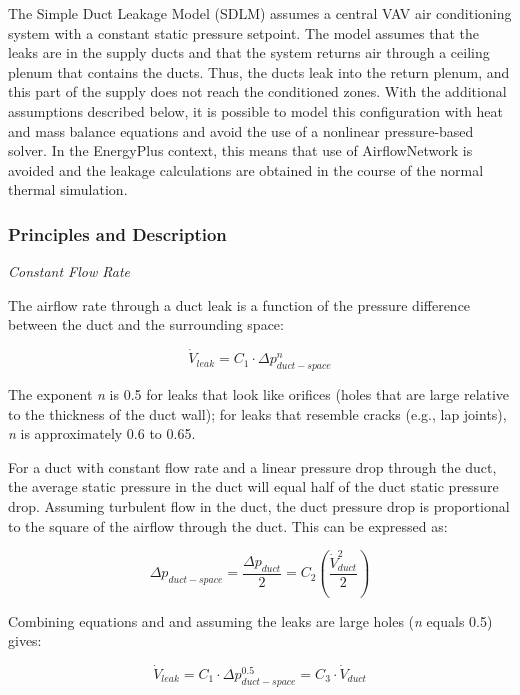 The Simple Duct Leakage Model (SDLM) assumes a central VAV air conditioning system with a constant static pressure setpoint. The model assumes that the leaks are in the supply ducts and that the system returns air through a ceiling plenum that contains the ducts. Thus, the ducts leak into the return plenum, and this part of the supply does not reach the conditioned zones. With the additional assumptions described below, it is possible to model this configuration with heat and mass balance equations and avoid the use of a nonlinear pressure-based solver. In the EnergyPlus context, this means that use of AirflowNetwork is avoided and the leakage calculations are obtained in the course of the normal thermal simulation.

\subsubsection{Principles and Description}\label{principles-and-description}

\emph{Constant Flow Rate}

The airflow rate through a duct leak is a function of the pressure difference between the duct and the surrounding space:

\begin{equation}
{\dot V_{leak}} = {C_1} \cdot \Delta p_{duct - space}^n
\end{equation}

The exponent \emph{n} is 0.5 for leaks that look like orifices (holes that are large relative to the thickness of the duct wall); for leaks that resemble cracks (e.g., lap joints), \emph{n} is approximately 0.6 to 0.65.

For a duct with constant flow rate and a linear pressure drop through the duct, the average static pressure in the duct will equal half of the duct static pressure drop. Assuming turbulent flow in the duct, the duct pressure drop is proportional to the square of the airflow through the duct. This can be expressed as:

\begin{equation}
\Delta {p_{duct - space}} = \frac{{\Delta {p_{duct}}}}{2} = {C_2}\left( {\frac{{\dot V_{duct}^2}}{2}} \right)
\end{equation}

Combining equations and and assuming the leaks are large holes (\emph{n} equals 0.5) gives:

\begin{equation}
{\dot V_{leak}} = {C_1} \cdot \Delta p_{duct - space}^{0.5} = {C_3} \cdot {\dot V_{duct}}
\end{equation}

